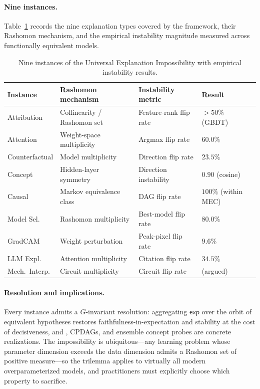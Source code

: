 \paragraph{Nine instances.}
Table~\ref{tab:summary-instances} records the nine explanation types covered
by the framework, their Rashomon mechanism, and the empirical instability
magnitude measured across functionally equivalent models.

\begin{table}[h]
\centering
\small
\caption{Nine instances of the Universal Explanation Impossibility with
empirical instability results.}
\label{tab:summary-instances}
\begin{tabular}{llll}
\toprule
Instance & Rashomon mechanism & Instability metric & Result \\
\midrule
Attribution   & Collinearity / Rashomon set & Feature-rank flip rate
              & $>50\%$ (GBDT)\\
Attention     & Weight-space multiplicity   & Argmax flip rate
              & $60.0\%$ \\
Counterfactual & Model multiplicity         & Direction flip rate
              & $23.5\%$ \\
Concept       & Hidden-layer symmetry       & Direction instability
              & $0.90$ (cosine) \\
Causal        & Markov equivalence class    & DAG flip rate
              & $100\%$ (within MEC) \\
Model Sel.    & Rashomon multiplicity       & Best-model flip rate
              & $80.0\%$ \\
GradCAM       & Weight perturbation         & Peak-pixel flip rate
              & $9.6\%$ \\
LLM Expl.     & Attention multiplicity      & Citation flip rate
              & $34.5\%$ \\
Mech.\ Interp. & Circuit multiplicity       & Circuit flip rate
              & (argued) \\
\bottomrule
\end{tabular}
\end{table}

\paragraph{Resolution and implications.}
Every instance admits a $G$-invariant resolution: aggregating $\mathsf{exp}$
over the orbit of equivalent hypotheses restores faithfulness-in-expectation
and stability at the cost of decisiveness, and \DASH{}, CPDAGs, and ensemble
concept probes are concrete realizations.
The impossibility is ubiquitous---any learning problem whose parameter
dimension exceeds the data dimension admits a Rashomon set of positive
measure---so the trilemma applies to virtually all modern overparameterized
models, and practitioners must explicitly choose which property to sacrifice.
